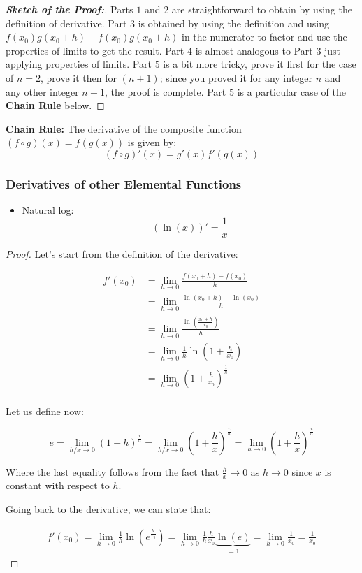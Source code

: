 \documentclass[a4paper,11pt]{article}
\theoremstyle{definition}
\theoremstyle{plain}
\begin{document}
\begin{proof}[\textbf{Sketch of the Proof:}]
Parts \(1\) and \(2\) are straightforward
to obtain by using the definition of derivative. Part \(3\) is obtained
by using the definition and using \(f(x_0)g(x_0+h) - f(x_0)g(x_0+h)\) in
the numerator to factor and use the properties of limits to get the
result. Part \(4\) is almost analogous to Part \(3\) just applying
properties of limits. Part \(5\) is a bit more tricky, prove it first for the case of $n = 2$, prove it then for $(n+1)$; since you proved it for any integer $n$ and any other integer $n+1$, the proof is complete. Part \(5\) is a particular case of the \textbf{Chain Rule} below.
\end{proof}

\textbf{Chain Rule:} The derivative of the composite function
\((f\circ g)(x) = f(g(x))\) is given by: \[
\left(f\circ g\right)'(x) = g'(x)f'\left(g(x)\right)
\]

\subsubsection{Derivatives of other Elemental
Functions}\label{derivatives-of-other-elemental-functions}

\begin{itemize}
\item
  Natural log: \[\left(\ln(x)\right)' = \frac{1}{x}\]
\end{itemize}

\begin{proof}
Let's start from the definition of the derivative:

\begin{align*}
f'(x_0) &= \lim_{h\rightarrow 0}{\frac{f(x_0+h)-f(x_0)}{h}} \\
&= \lim_{h\rightarrow 0}{\frac{\ln(x_0+h)-\ln(x_0)}{h}} \\
&= \lim_{h\rightarrow 0}{\frac{\ln\left(\frac{x_0 + h}{x_0}\right)}{h}} \\
&= \lim_{h\rightarrow 0}{\frac{1}{h}\ln\left(1+\frac{h}{x_0}\right)} \\
&= \lim_{h\rightarrow 0}{\left(1+\frac{h}{x_0}\right)^{\frac{1}{h}}} \\
\end{align*}

Let us define now:

\[
e = \lim_{h / x \rightarrow 0}{\left(1+h\right)^{\frac{x}{h}}} = \lim_{h / x\rightarrow 0}{\left(1+\frac{h}{x}\right)^{\frac{x}{h}}} = \lim_{h\rightarrow 0}{\left(1+\frac{h}{x}\right)^{\frac{x}{h}}}
\]

Where the last equality follows from the fact that
\(\frac{h}{x}\rightarrow 0\) as \(h\rightarrow 0\) since \(x\) is
constant with respect to \(h\).

Going back to the derivative, we can state that:

\begin{align*}
f'(x_0) = \lim_{h\rightarrow 0}{\frac{1}{h}\ln\left(e^{\frac{h}{x_0}}\right)} = \lim_{h\rightarrow 0}{\frac{1}{h}\frac{h}{x_0}\underset{=1}{\underbrace{\ln(e)}}} = \lim_{h\rightarrow 0}{\frac{1}{x_0}} = \frac{1}{x_0}
\end{align*}
\end{proof}
\end{document}
